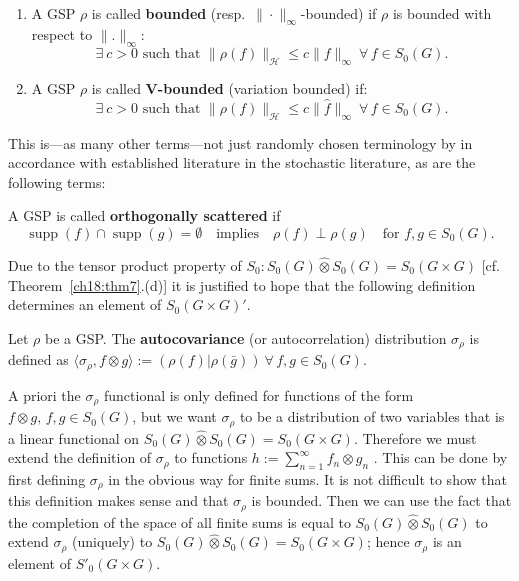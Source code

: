 \documentclass[graybox]{svmult}
\begin{document}
\begin{definition}\label{ch18:def4}\
\begin{enumerate}
\item[(a)] A GSP $\rho $ is called \textbf{bounded} (resp.\
  $\|\cdot\|_\infty$-bounded)
  if $\rho $ is bounded with respect to $\| .\| _{\infty }$:
\[
\exists \:  c > 0 \text{ such that }
\| \rho (f)\| _{\mathcal{H}} \le c\| f\| _{\infty } \
\forall \, f \in {S_{0}(G)}.
\]
\item[(b)] A GSP $\rho $ is called $\textbf{V}$\textbf{-bounded}
 (variation bounded) if:
\[
\exists \:  c > 0\text{ such that }\| \rho (f)\| _{\mathcal{H}} \le
c\| \hat{f}\| _{\infty } \ \forall \,  f \in {S_{0}(G)} .
\]
\end{enumerate}
\end{definition}
This is---as many other terms---not just randomly chosen
terminology by in accordance with established literature
in the stochastic literature, as are the following terms:

\begin{definition}\label{ch18:def5}
A GSP is called \textbf{orthogonally scattered} if
\[
\operatorname{supp}(f) \cap  \operatorname{supp}(g) = \emptyset \quad
\text{implies} \quad \rho (f)\perp \rho (g) \quad
\text{for} \,\,f,g\in {S_{0}(G)}.
\]

Due to the tensor product property of $S_{0}:
{S_{0}(G)}\hat{\otimes }{S_{0}(G)} = S_{0}(G \times G)$ [cf.~\cite{fe81-2} Theorem~\ref{ch18:thm7}.(d)] it is justified to
hope that the following definition
determines an element of $S_{0}(G\times G)'$.
\end{definition}

\begin{definition}\label{ch18:def6}
Let $\rho $ be a GSP.  The \textbf{autocovariance} (or
autocorrelation) distribution ${\sigma_{ \rho}}$ is defined as
$\langle\sigma _{\rho},f\otimes g\rangle := (\rho (f)| \rho (\bar{g}))
\ \forall \, f,g \in {S_{0}(G)}$.
\end{definition}

A priori the $
{\sigma_{ \rho}} $ functional is only defined for functions
of the form $f\otimes g, \, f,g \in {S_{0}(G)}$,
but we want ${\sigma_{ \rho}}$ to be a
distribution of two variables that is a linear functional on
${S_{0}(G)}\hat{\otimes }{S_{0}(G)} = S_{0}(G\times G)$.
Therefore we must
extend the definition of ${\sigma_{ \rho}}$ to functions $h:=
\sum^{\infty }_{n=1}f_{n}\otimes g_{n}$ .
This can be done by first
defining ${\sigma_{ \rho}}$ in the obvious way for finite sums.
It is not  difficult to show that this definition makes sense and that
${\sigma_{ \rho}}$ is bounded.
Then we can use the fact that the completion of
the space of all finite sums is equal to
${S_{0}(G)}\hat{\otimes }{S_{0}(G)}$ to extend
$\sigma _{\rho}$ (uniquely) to ${S_{0}(G)}\hat{\otimes
}{S_{0}(G)} = S_{0}(G\times G)$; hence $\sigma _{\rho}$
is an element of $S'_{0}(G\times G)$.
\end{document}
